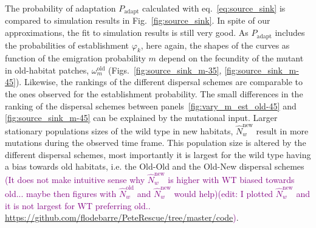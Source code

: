 \documentclass[11pt]{article}
\newcommand{\florence}[1]{\textcolor{purple}{(#1)}} %
\begin{document}
The probability of adaptation $P_{\mathrm{adapt}}$ calculated with eq.~\ref{eq:source_sink} is compared to simulation results in Fig.~\ref{fig:source_sink}. In spite of our approximations, the fit to simulation results is still very good. 
As $P_{\mathrm{adapt}}$ includes the probabilities of establishment $\varphi_{k}$, here again, the shapes of the curves as function of the emigration probability $m$ depend on the fecundity of the mutant in old-habitat patches, $\omega^\text{old}_m$ (Figs.~\ref{fig:source_sink_m-35}, \ref{fig:source_sink_m-45}). Likewise, the rankings of the different dispersal schemes are comparable to the ones observed for the establishment probability. The small differences in the ranking of the dispersal schemes between panels~\ref{fig:vary_m_est_old-45} and \ref{fig:source_sink_m-45} can be explained by the mutational input. Larger stationary populations sizes of the wild type in new habitats, $\widehat{N}_w^{\text{new}}$ result in more mutations during the observed time frame. This population size is altered by the different dispersal schemes, most importantly it is largest for the wild type having a bias towards old habitats, i.e. the Old-Old and the Old-New dispersal schemes \florence{It does not make intuitive sense why $\widehat{N}_w^{\text{new}}$ is higher with WT biased towards old... maybe then figures with $\widehat{N}_w^{\text{old}}$ and $\widehat{N}_w^{\text{new}}$ would help}\florence{edit: I plotted $\widehat{N}_w^{\text{new}}$ and it is not largest for WT preferring old.. \url{https://github.com/flodebarre/PeteRescue/tree/master/code}}. 
\end{document}
